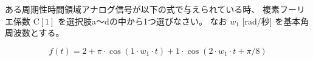 ある周期性時間領域アナログ信号が以下の式で与えられている時、
複素フーリエ係数 $\textrm{C}[1]$ を選択肢a〜dの中から1つ選びなさい。
なお $w_1$ [rad/秒] を基本角周波数とする。

\[
f(t) = 
2
+ \pi \cdot \cos( 1 \cdot w_1 \cdot t )
+ 1 \cdot \cos( 2 \cdot w_1 \cdot t + \pi/8 )
\]
